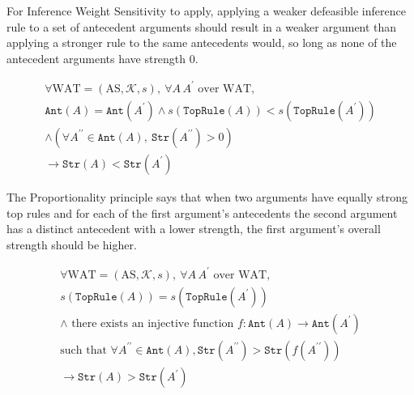 \documentclass[runningheads]{llncs}
\newcommand{\K}{\mathcal{K}}
\newcommand{\pr}{^\prime}
\newcommand{\TopRule}{\texttt{TopRule}}
\newcommand{\Ant}{\texttt{Ant}}
\newcommand{\Str}{\texttt{Str}}
\begin{document}
For Inference Weight Sensitivity to apply, applying a weaker defeasible inference rule to a set of antecedent arguments should result in a weaker argument than applying a stronger rule to the same antecedents would, so long as none of the antecedent arguments have strength 0.
\begin{principle}
\begin{multline*}
    \forall \text{WAT} = ( \text{AS}, \K, s ),\ \forall A\, A\pr \text{ over WAT},\\\Ant(A) = \Ant(A\pr) \wedge s(\TopRule(A)) < s(\TopRule(A\pr))\\\wedge (\forall A^{\prime\prime} \in \Ant(A),\ \Str(A^{\prime\prime}) > 0)\\\rightarrow \Str(A) < \Str(A\pr)
\end{multline*}
\end{principle}

The Proportionality principle says that when two arguments have equally strong top rules and for each of the first argument's antecedents the second argument has a distinct antecedent with a lower strength, the first argument's overall strength should be higher.
\begin{principle}[Proportionality]
\begin{multline*}
    \forall \text{WAT} = ( \text{AS}, \K, s ),\ \forall A\, A\pr \text{ over WAT},\\s(\TopRule(A)) = s(\TopRule(A\pr)) \\\wedge \text{ there exists an injective function } f: \Ant(A) \rightarrow \Ant(A\pr) \\\text{such that } \forall A^{\prime\prime} \in \Ant(A), \Str(A^{\prime\prime}) > \Str(f(A^{\prime\prime}))\\\rightarrow \Str(A) > \Str(A\pr)
\end{multline*}
\end{principle}

\end{document}
